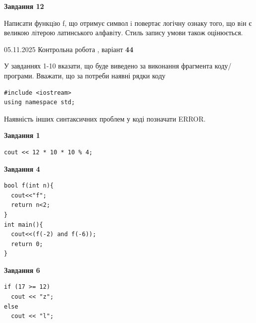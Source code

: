 \documentclass[12pt, ukrainian]{article}
\begin{document}
{\begin {large}
\begin{minipage}[t]{11.0cm}
\begin{center}
\textbf{Завдання 12}
\end{center}

Написати функцiю f, що отримує символ i повертає логічну ознаку того, що вiн є великою лiтерою латинського алфавiту. Стиль запису умови також оцінюється.\par

\end{minipage}

\end {large}}
\newpage

{\Large{05.11.2025 Контрольна робота , варіант  \No \textbf { 44 }\par}}
{
\begin {large}
У завданнях 1-10 вказати, що буде виведено за виконання фрагмента коду/про\-гра\-ми.
Вважати, що за потреби наявні рядки коду
\begin{verbatim}
#include <iostream>
using namespace std;
\end{verbatim}
Наявність інших синтаксичних проблем у коді позначати ERROR.

\begin{minipage}[t]{7.0cm}

\begin{center}
\textbf{Завдання 1}
\end{center}
\vspace{-8mm}

\begin{verbatim}
cout << 12 * 10 * 10 % 4;
\end{verbatim}



\begin{center}
\textbf{Завдання 4}
\end{center}
\vspace{-8mm}

\begin{verbatim}
bool f(int n){
  cout<<"f";
  return n<2;
}
int main(){
  cout<<(f(-2) and f(-6));
  return 0;
}
\end{verbatim}



\begin{center}
\textbf{Завдання 6}
\end{center}
\vspace{-8mm}

\begin{verbatim}
if (17 >= 12)
  cout << "z";
else
  cout << "l";
\end{verbatim}




\end{minipage}
\end{large}}
\end{document}
